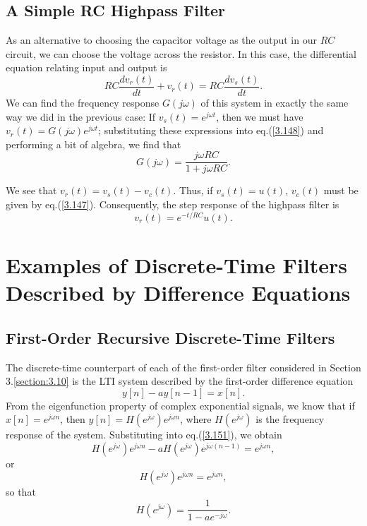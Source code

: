 \documentclass[a4paper,10pt,twoside]{book}
\begin{document}
\subsection{A Simple RC Highpass Filter}

As an alternative to choosing the capacitor voltage as the output in our $RC$ circuit, we can choose the voltage across the resistor. In this case, the differential equation relating input and output is
\begin{equation}
    RC\frac{dv_r(t)}{dt}+v_r(t)=RC\frac{dv_s(t)}{dt}.
    \label{3.148}
\end{equation}
We can find the frequency response $G(j\omega)$ of this system in exactly the same way we did in the previous case: If $v_s(t)=e^{j\omega t}$, then we must have $v_r(t)=G(j\omega)e^{j\omega t}$; substituting these expressions into eq.\;(\ref{3.148}) and performing a bit of algebra, we find that
\begin{equation}
    G(j\omega)=\frac{j\omega RC}{1+j\omega RC}.
    \label{3.149}
\end{equation}

We see that $v_r(t)=v_s(t)-v_c(t)$. Thus, if $v_s(t)=u(t)$, $v_c(t)$ must be given by eq.\;(\ref{3.147}). Consequently, the step response of the highpass filter is
\begin{equation}
    v_r(t)=e^{-t/RC}u(t).
    \label{3.150}
\end{equation}

\section{Examples of Discrete-Time Filters Described by Difference Equations}
\subsection{First-Order Recursive Discrete-Time Filters}

The discrete-time counterpart of each of the first-order filter considered in Section 3.\ref{section:3.10} is the LTI system described by the first-order difference equation
\begin{equation}
    y[n]-ay[n-1]=x[n].
    \label{3.151}
\end{equation}
From the eigenfunction property of complex exponential signals, we know that if $x[n]=e^{j\omega n}$, then $y[n]=H(e^{j\omega})e^{j\omega n}$, where $H(e^{j\omega})$ is the frequency response of the system. Substituting into eq.\;(\ref{3.151}), we obtain
\begin{equation}
    H(e^{j\omega})e^{j\omega n}-aH(e^{j\omega})e^{j\omega(n-1)}=e^{j\omega n},
    \label{3.152}
\end{equation}
or
\begin{equation}
    [1-ae^{-j\omega}]H(e^{j\omega})e^{j\omega n}=e^{j\omega n},
    \label{3.153}
\end{equation}
so that
\begin{equation}
    H(e^{j\omega})=\frac1{1-ae^{-j\omega}}.
    \label{3.154}
\end{equation}
\end{document}
